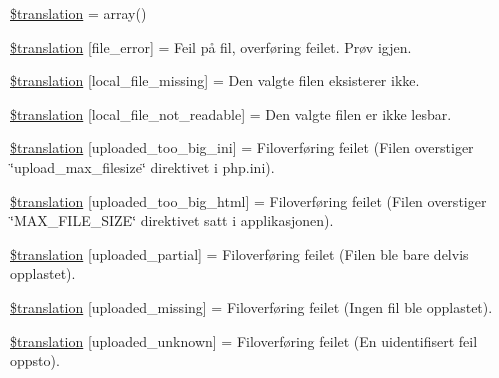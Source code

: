 \begin{DoxyCompactItemize}
\item 
\hyperlink{class_8upload_8no___n_o_8php_a1f198d410fecc3871ebdd468d343a5e3}{\$translation} = array()
\item 
\hyperlink{class_8upload_8no___n_o_8php_ac7498e49b9771b04698029aa61c70821}{\$translation} \mbox{[}\textquotesingle{}file\+\_\+error\textquotesingle{}\mbox{]} = \textquotesingle{}Feil på fil, overføring feilet. Prøv igjen.\textquotesingle{}
\item 
\hyperlink{class_8upload_8no___n_o_8php_a6ec3d3a47ab70d77e7aa593e82ead10e}{\$translation} \mbox{[}\textquotesingle{}local\+\_\+file\+\_\+missing\textquotesingle{}\mbox{]} = \textquotesingle{}Den valgte filen eksisterer ikke.\textquotesingle{}
\item 
\hyperlink{class_8upload_8no___n_o_8php_a60104befef9b241f3a7a6a755618a4b3}{\$translation} \mbox{[}\textquotesingle{}local\+\_\+file\+\_\+not\+\_\+readable\textquotesingle{}\mbox{]} = \textquotesingle{}Den valgte filen er ikke lesbar.\textquotesingle{}
\item 
\hyperlink{class_8upload_8no___n_o_8php_a6a08dcd0d3651fdd098568f6b2f0a42c}{\$translation} \mbox{[}\textquotesingle{}uploaded\+\_\+too\+\_\+big\+\_\+ini\textquotesingle{}\mbox{]} = \textquotesingle{}Filoverføring feilet (Filen overstiger \char`\"{}upload\+\_\+max\+\_\+filesize\char`\"{} direktivet i php.\+ini).\textquotesingle{}
\item 
\hyperlink{class_8upload_8no___n_o_8php_a623d5b8b92169f57d7e43458aa911cbb}{\$translation} \mbox{[}\textquotesingle{}uploaded\+\_\+too\+\_\+big\+\_\+html\textquotesingle{}\mbox{]} = \textquotesingle{}Filoverføring feilet (Filen overstiger \char`\"{}M\+A\+X\+\_\+\+F\+I\+L\+E\+\_\+\+S\+I\+Z\+E\char`\"{} direktivet satt i applikasjonen).\textquotesingle{}
\item 
\hyperlink{class_8upload_8no___n_o_8php_a967c17da21b0a2d3bd65cca3a9ca0ea8}{\$translation} \mbox{[}\textquotesingle{}uploaded\+\_\+partial\textquotesingle{}\mbox{]} = \textquotesingle{}Filoverføring feilet (Filen ble bare delvis opplastet).\textquotesingle{}
\item 
\hyperlink{class_8upload_8no___n_o_8php_a0cce433260be65f1f35853a6b4b8952b}{\$translation} \mbox{[}\textquotesingle{}uploaded\+\_\+missing\textquotesingle{}\mbox{]} = \textquotesingle{}Filoverføring feilet (Ingen fil ble opplastet).\textquotesingle{}
\item 
\hyperlink{class_8upload_8no___n_o_8php_a4a9168e922b827e6a28b5db1c00774ca}{\$translation} \mbox{[}\textquotesingle{}uploaded\+\_\+unknown\textquotesingle{}\mbox{]} = \textquotesingle{}Filoverføring feilet (En uidentifisert feil oppsto).\textquotesingle{}

\end{DoxyCompactItemize}
